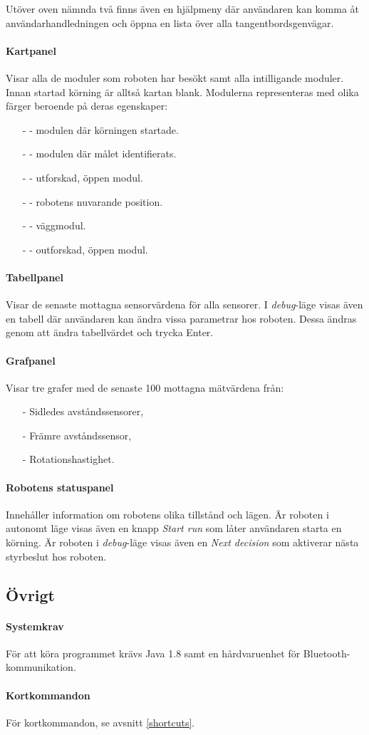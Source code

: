 \documentclass[11pt]{article}
\begin{document}
Utöver oven nämnda två finns även en hjälpmeny där användaren kan komma åt användarhandledningen och öppna en lista över alla tangentbordsgenvägar.

\paragraph{Kartpanel} Visar alla de moduler som roboten har besökt samt alla intilligande moduler. Innan startad körning är alltså kartan blank. Modulerna representeras med olika färger beroende på deras egenskaper:
\begin{itemize}
  \item[-]  - modulen där körningen startade.
  \item[-]  - modulen där målet identifierats.
  \item[-]  - utforskad, öppen modul.
  \item[-]  - robotens nuvarande position.
  \item[-]  - väggmodul.
  \item[-]  - outforskad, öppen modul.
\end{itemize}

\paragraph{Tabellpanel} Visar de senaste mottagna sensorvärdena för alla sensorer. I \textit{debug}-läge visas även en tabell där användaren kan ändra vissa parametrar hos roboten. Dessa ändras genom att ändra tabellvärdet och trycka Enter.

\paragraph{Grafpanel}
Visar tre grafer med  de senaste 100 mottagna mätvärdena från:
\begin{itemize}
  \item[-] Sidledes avståndssensorer,
  \item[-] Främre avståndssensor,
  \item[-] Rotationshastighet.
\end{itemize}

\paragraph{Robotens statuspanel}
Innehåller information om robotens olika tillstånd och lägen. Är roboten i autonomt läge visas även en knapp \emph{Start run} som låter användaren starta en körning. Är roboten i \textit{debug}-läge visas även en \emph{Next decision} som aktiverar nästa styrbeslut hos roboten. 

\subsection{Övrigt}
\paragraph{Systemkrav} För att köra programmet krävs Java 1.8 samt en hårdvaruenhet för Bluetooth\textsuperscript{\circledR}-kommunikation.
\paragraph{Kortkommandon}\label{kortkommandon}

För kortkommandon, se avsnitt \ref{shortcuts}.
\end{document}
